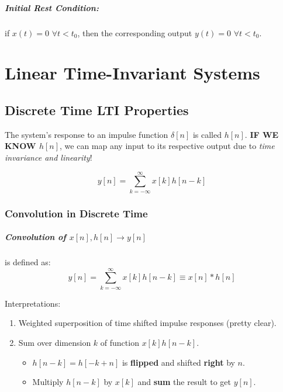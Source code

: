 \documentclass[a4paper,12pt]{report}
\begin{document}
\paragraph{Initial Rest Condition: } if $x(t) = 0$ $\forall t < t_0$, then the corresponding output $y(t) = 0$ $\forall t< t_0$.


\chapter{Linear Time-Invariant Systems}

\section{Discrete Time LTI Properties}

The system's response to an impulse function $\delta[n]$ is called $h[n]$. \textbf{IF WE KNOW $h[n]$}, we can map any input to its respective output due to \textit{time invariance and linearity}!

\begin{equation}
y[n] = \sum_{k=-\infty}^{\infty} x[k] h[n-k]
\end{equation}

\subsection{Convolution in Discrete Time}

\paragraph{Convolution of $x[n], h[n] \to y[n]$ } is defined as: 
\begin{equation}
y[n] = \sum_{k=-\infty}^{\infty} x[k] h[n-k] \equiv x[n] * h[n]
\end{equation}


Interpretations:
\begin{enumerate}
\item Weighted superposition of time shifted impulse responses (pretty clear).
\item Sum over dimension $k$ of function $x[k]h[n-k]$.
\begin{itemize}
\item $h[n-k] = h[-k+n]$ is \textbf{flipped} and shifted \textbf{right} by $n$.
\item Multiply $h[n-k]$ by $x[k]$ and \textbf{sum} the result to get $y[n]$.
\end{itemize}
\end{enumerate}
\end{document}

